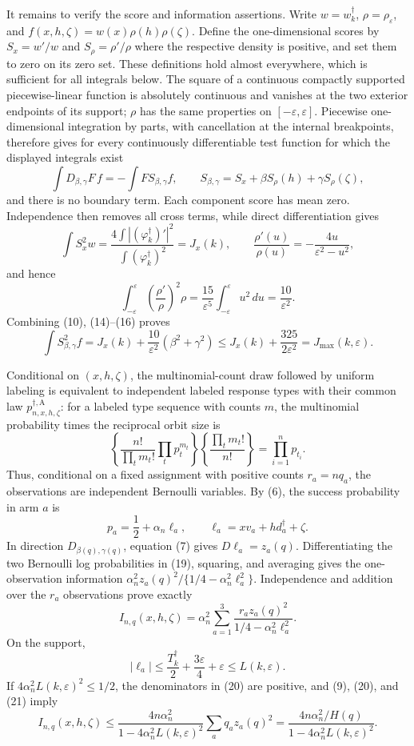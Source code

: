 It remains to verify the score and information assertions.  Write
\(w=w_k^\dagger\), \(\rho=\rho_\varepsilon\), and
\(f(x,h,\zeta)=w(x)\rho(h)\rho(\zeta)\).  Define the one-dimensional scores by
\(S_x=w'/w\) and \(S_\rho=\rho'/\rho\) where the respective density is positive,
and set them to zero on its zero set.  These definitions hold almost everywhere,
which is sufficient for all integrals below.  The square of a continuous compactly
supported piecewise-linear function is absolutely continuous and vanishes at the
two exterior endpoints of its support; \(\rho\) has the same properties on
\([-\varepsilon,\varepsilon]\).  Piecewise one-dimensional integration by parts,
with cancellation at the internal breakpoints, therefore gives for every
continuously differentiable test function for which the displayed integrals exist
\[
 \int D_{\beta,\gamma}F\,f
 =-\int F S_{\beta,\gamma}f,
 \qquad
 S_{\beta,\gamma}=S_x+\beta S_\rho(h)+\gamma S_\rho(\zeta),
\tag{14}
\]
and there is no boundary term.  Each component score has mean zero.  Independence
then removes all cross terms, while direct differentiation gives
\[
 \int S_x^2w
 =\frac{4\int| (\varphi_k^\dagger)'|^2}
 {\int(\varphi_k^\dagger)^2}=J_x(k),
 \qquad
 \frac{\rho'(u)}{\rho(u)}=-\frac{4u}{\varepsilon^2-u^2},
\tag{15}
\]
and hence
\[
 \int_{-\varepsilon}^{\varepsilon}
 \left(\frac{\rho'}{\rho}\right)^2\rho
 =\frac{15}{\varepsilon^5}
 \int_{-\varepsilon}^{\varepsilon}u^2\,du
 =\frac{10}{\varepsilon^2}.
\tag{16}
\]
Combining (10), (14)--(16) proves
\[
 \int S_{\beta,\gamma}^2f
 =J_x(k)+\frac{10}{\varepsilon^2}(\beta^2+\gamma^2)
 \le J_x(k)+\frac{325}{2\varepsilon^2}
 =J_{\max}(k,\varepsilon).
\tag{17}
\]

Conditional on \((x,h,\zeta)\), the multinomial-count draw followed by uniform
labeling is equivalent to independent labeled response types with their common law
\(p_{n,x,h,\zeta}^{\dagger,\mathrm A}\): for a labeled type sequence with counts
\(m\), the multinomial probability times the reciprocal orbit size is
\[
 \left\{\frac{n!}{\prod_tm_t!}\prod_t p_t^{m_t}\right\}
 \left\{\frac{\prod_tm_t!}{n!}\right\}
 =\prod_{i=1}^np_{t_i}.
\tag{18}
\]
Thus, conditional on a fixed assignment with positive counts \(r_a=nq_a\), the
observations are independent Bernoulli variables.  By (6), the success probability
in arm \(a\) is
\[
 p_a=\frac12+\alpha_n\ell_a,
 \qquad
 \ell_a=xv_a+hd_a^\dagger+\zeta.
\tag{19}
\]
In direction \(D_{\beta(q),\gamma(q)}\), equation (7) gives
\(D\ell_a=z_a(q)\).  Differentiating the two Bernoulli log probabilities in
(19), squaring, and averaging gives the one-observation information
\(\alpha_n^2z_a(q)^2/\{1/4-\alpha_n^2\ell_a^2\}\).  Independence and addition
over the \(r_a\) observations prove exactly
\[
 I_{n,q}(x,h,\zeta)
 =\alpha_n^2\sum_{a=1}^3
 \frac{r_az_a(q)^2}{1/4-\alpha_n^2\ell_a^2}.
\tag{20}
\]
On the support,
\[
 |\ell_a|\le \frac{T_k^\dagger}{2}+\frac{3\varepsilon}{4}
 +\varepsilon\le L(k,\varepsilon).
\tag{21}
\]
If \(4\alpha_n^2L(k,\varepsilon)^2\le1/2\), the denominators in (20) are
positive, and (9), (20), and (21) imply
\[
 I_{n,q}(x,h,\zeta)
 \le\frac{4n\alpha_n^2}{1-4\alpha_n^2L(k,\varepsilon)^2}
 \sum_aq_az_a(q)^2
 =\frac{4n\alpha_n^2/H(q)}
 {1-4\alpha_n^2L(k,\varepsilon)^2}.
\tag{22}
\]

